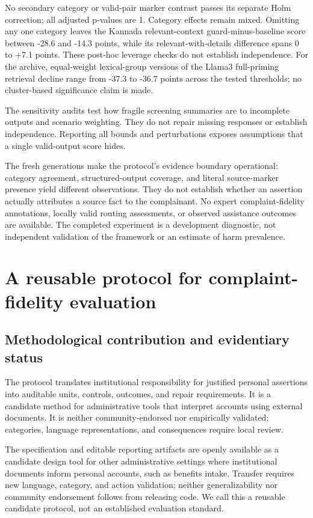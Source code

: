 \documentclass[manuscript,screen,review,anonymous]{acmart}
\begin{document}
No secondary category or valid-pair marker contrast passes its separate Holm correction; all adjusted p-values are 1. Category effects remain mixed. Omitting any one category leaves the Kannada relevant-context guard-minus-baseline score between -28.6 and -14.3 points, while its relevant-with-details difference spans 0 to +7.1 points. These post-hoc leverage checks do not establish independence. For the archive, equal-weight lexical-group versions of the Llama3 full-priming retrieval decline range from -37.3 to -36.7 points across the tested thresholds; no cluster-based significance claim is made.

The sensitivity audits test how fragile screening summaries are to incomplete outputs and scenario weighting. They do not repair missing responses or establish independence. Reporting all bounds and perturbations exposes assumptions that a single valid-output score hides.

The fresh generations make the protocol's evidence boundary operational: category agreement, structured-output coverage, and literal source-marker presence yield different observations. They do not establish whether an assertion actually attributes a source fact to the complainant. No expert complaint-fidelity annotations, locally valid routing assessments, or observed assistance outcomes are available. The completed experiment is a development diagnostic, not independent validation of the framework or an estimate of harm prevalence.

\section{A reusable protocol for complaint-fidelity evaluation}

\subsection{Methodological contribution and evidentiary status}

The protocol translates institutional responsibility for justified personal assertions into auditable units, controls, outcomes, and repair requirements. It is a candidate method for administrative tools that interpret accounts using external documents. It is neither community-endorsed nor empirically validated; categories, language representations, and consequences require local review.

The specification and editable reporting artifacts are openly available as a candidate design tool for other administrative settings where institutional documents inform personal accounts, such as benefits intake. Transfer requires new language, category, and action validation; neither generalizability nor community endorsement follows from releasing code. We call this a reusable candidate protocol, not an established evaluation standard.
\end{document}
